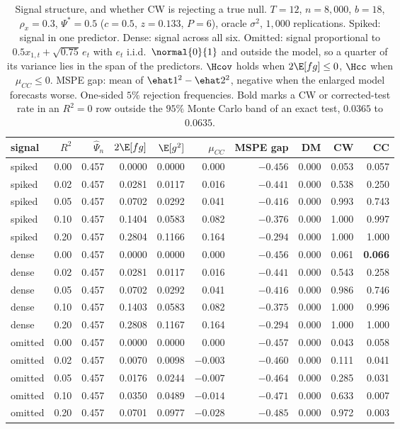 \begin{table}[htbp]
\centering
\caption{Signal structure, and whether CW is rejecting a true null. $T=12$, $n=8{,}000$, $b=18$, $\rho_x=0.3$, $\Psi^*=0.5$ ($c=0.5$, $z=0.133$, $P=6$), oracle $\sigma^2$, $1{,}000$ replications. Spiked: signal in one predictor. Dense: signal across all six. Omitted: signal proportional to $0.5x_{1,t}+\sqrt{0.75}\,e_t$ with $e_t$ i.i.d.\ $\normal{0}{1}$ and outside the model, so a quarter of its variance lies in the span of the predictors. $\Hcov$ holds when $2\E[fg]\le0$, $\Hcc$ when $\mu_{CC}\le0$. MSPE gap: mean of $\ehat1^2-\ehat2^2$, negative when the enlarged model forecasts worse. One-sided $5\%$ rejection frequencies. Bold marks a CW or corrected-test rate in an $R^2=0$ row outside the $95\%$ Monte Carlo band of an exact test, $0.0365$ to $0.0635$.}
\label{tab:mc-signal}
\small
\setlength{\tabcolsep}{4.5pt}
\begin{tabular}{lrrrrrrrrr}
\toprule
signal & $R^2$ & $\hat\Psi_n$ & $2\E[fg]$ & $\E[g^2]$ & $\mu_{CC}$ & MSPE gap & DM & CW & CC \\
\midrule
spiked & 0.00 & 0.457 & 0.0000 & 0.0000 & 0.000 & $-0.456$ & 0.000 & 0.053 & 0.057 \\
spiked & 0.02 & 0.457 & 0.0281 & 0.0117 & 0.016 & $-0.441$ & 0.000 & 0.538 & 0.250 \\
spiked & 0.05 & 0.457 & 0.0702 & 0.0292 & 0.041 & $-0.416$ & 0.000 & 0.993 & 0.743 \\
spiked & 0.10 & 0.457 & 0.1404 & 0.0583 & 0.082 & $-0.376$ & 0.000 & 1.000 & 0.997 \\
spiked & 0.20 & 0.457 & 0.2804 & 0.1166 & 0.164 & $-0.294$ & 0.000 & 1.000 & 1.000 \\
dense & 0.00 & 0.457 & 0.0000 & 0.0000 & 0.000 & $-0.456$ & 0.000 & 0.061 & \textbf{0.066} \\
dense & 0.02 & 0.457 & 0.0281 & 0.0117 & 0.016 & $-0.441$ & 0.000 & 0.543 & 0.258 \\
dense & 0.05 & 0.457 & 0.0702 & 0.0292 & 0.041 & $-0.416$ & 0.000 & 0.986 & 0.746 \\
dense & 0.10 & 0.457 & 0.1403 & 0.0583 & 0.082 & $-0.375$ & 0.000 & 1.000 & 0.996 \\
dense & 0.20 & 0.457 & 0.2808 & 0.1167 & 0.164 & $-0.294$ & 0.000 & 1.000 & 1.000 \\
omitted & 0.00 & 0.457 & 0.0000 & 0.0000 & 0.000 & $-0.457$ & 0.000 & 0.043 & 0.058 \\
omitted & 0.02 & 0.457 & 0.0070 & 0.0098 & $-0.003$ & $-0.460$ & 0.000 & 0.111 & 0.041 \\
omitted & 0.05 & 0.457 & 0.0176 & 0.0244 & $-0.007$ & $-0.464$ & 0.000 & 0.285 & 0.031 \\
omitted & 0.10 & 0.457 & 0.0350 & 0.0489 & $-0.014$ & $-0.471$ & 0.000 & 0.633 & 0.007 \\
omitted & 0.20 & 0.457 & 0.0701 & 0.0977 & $-0.028$ & $-0.485$ & 0.000 & 0.972 & 0.003 \\
\bottomrule
\end{tabular}
\end{table}
